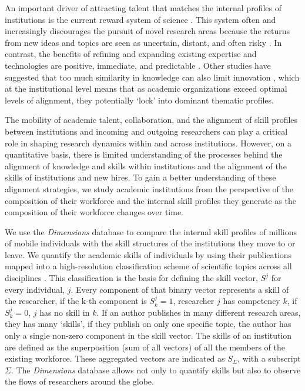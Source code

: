 \documentclass[draft,final]{vutinfth} %
\begin{document}
An important driver of attracting talent that matches the internal profiles of institutions is the current reward system of science \cite{merton1957priorities}. This system often and increasingly discourages the pursuit of novel research areas because the returns from new ideas and topics are seen as uncertain, distant, and often risky \cite{heinze2008sponsor}. In contrast, the benefits of refining and expanding existing expertise and technologies are positive, immediate, and predictable \cite{march1991exploration}. Other studies have suggested that too much similarity in knowledge can also limit innovation \cite{fleming2001recombinant}, which at the institutional level means that as academic organizations exceed optimal levels of alignment, they potentially `lock' into dominant thematic profiles.

The mobility of academic talent, collaboration, and the alignment of skill profiles between institutions and incoming and outgoing researchers can play a critical role in shaping research dynamics within and across institutions. However, on a quantitative basis, there is limited understanding of the processes behind the alignment of knowledge and skills within institutions and the alignment of the skills of institutions and new hires. To gain a better understanding of these alignment strategies, we study academic institutions from the perspective of the composition of their workforce and the internal skill profiles they generate as the composition of their workforce changes over time. 

We use the {\em Dimensions} database to compare the internal skill profiles of millions of mobile individuals with the skill structures of the institutions they move to or leave.
We quantify the academic skills of individuals by using their  publications mapped into a high-resolution classification scheme of scientific topics across all disciplines \cite{traag2019louvain}. This classification is the basis for defining the skill vector, $S^j$ for every individual, $j$. Every component of that binary vector represents a skill of the researcher, if the k-th component is $S^j_k=1$, researcher $j$ has competency $k$, if $S^j_k=0$, $j$ has no skill in $k$. If an author publishes in many different research areas, they has many `skills', if they publish on only one specific topic, the author has only a single non-zero component in the skill vector. The skills of an institution are defined as the superposition (sum of all vectors) of all the members of the existing workforce. These aggregated vectors are indicated as $S_\Sigma$, with a subscript $\Sigma$. The {\em Dimensions} database allows not only to quantify skills but also to observe the flows of researchers around the globe. 
\end{document}
